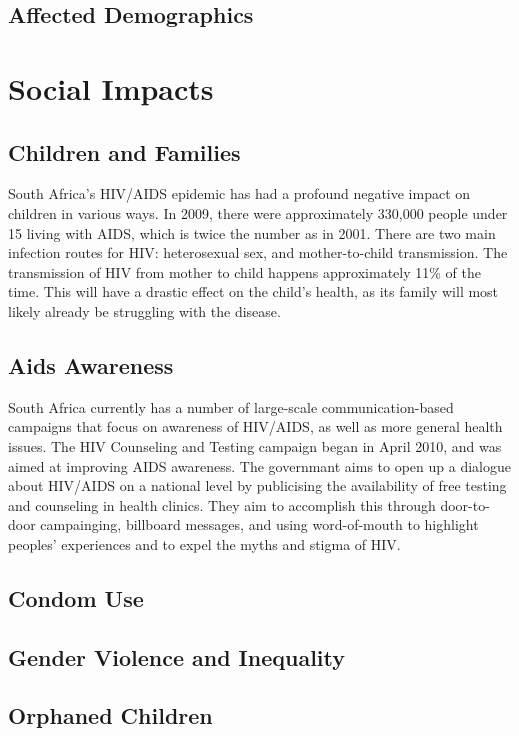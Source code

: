 \documentclass[12pt]{report}
\begin{document}
\subsection{Affected Demographics}

\section{Social Impacts}

\subsection{Children and Families}
South Africa's HIV/AIDS epidemic has had a profound negative impact on children in various ways.  
In 2009, there were approximately 330,000 people under 15 living with AIDS, which is twice the number as in 2001.
There are two main infection routes for HIV: heterosexual sex, and mother-to-child transmission.  The transmission of HIV from mother to child happens approximately 11\% of the time.
This will have a drastic effect on the child's health, as its family will most likely already be struggling with the disease\cite{avert}.

\subsection{Aids Awareness}
South Africa currently has a number of large-scale communication-based campaigns that focus on awareness of HIV/AIDS, as well as more general health issues.
The HIV Counseling and Testing campaign began in April 2010, and was aimed at improving AIDS awareness.
The governmant aims to open up a dialogue about HIV/AIDS on a national level by publicising the availability of free testing and counseling in health clinics.
They aim to accomplish this through door-to-door campainging, billboard messages, and using word-of-mouth to highlight peoples' experiences and to expel the myths and stigma of HIV.


\subsection{Condom Use}
\subsection{Gender Violence and Inequality}
\subsection{Orphaned Children}
\end{document}
